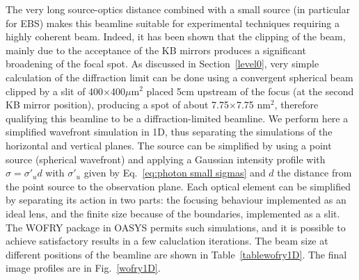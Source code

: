 \documentclass{iucr}              %
\begin{document}
The very long  source-optics distance combined with a small source (in particular for EBS) makes this beamline suitable for experimental techniques requiring a highly coherent beam. Indeed, it has been shown that the clipping of the beam, mainly due to the acceptance of the KB mirrors produces a significant broadening of the focal spot.  As discussed in Section~\ref{level0}, very simple calculation of the diffraction limit can be done using a convergent spherical beam clipped by a slit of 400$\times$400$ \mu$m$^2$ placed 5cm upstream of the focus (at the second KB mirror position), producing a spot of about 7.75$\times$7.75 nm$^2$, therefore qualifying this beamline to be a diffraction-limited beamline. We perform here a simplified wavefront simulation in 1D, thus separating the simulations of the horizontal and vertical planes. The source can be simplified by using a point source (spherical wavefront) and applying a Gaussian intensity profile with $\sigma=\sigma'_u d$ with $\sigma'_u$ given by Eq.~\ref{eq:photon small sigmas} and $d$ the distance from the point source to the observation plane. Each optical element can be simplified by separating its action in two parts: the focusing behaviour implemented as an ideal lens, and the finite size because of the boundaries, implemented as a slit. The WOFRY package in OASYS permits such simulations, and it is possible to achieve satisfactory results in a few caluclation iterations. The beam size at different positions of the beamline are shown in Table~\ref{tablewofry1D}. The final image profiles are in Fig.~\ref{wofry1D}.

\begin{table}[]
    \centering
    \caption{Beam sizes calculated with simplified wave optics propagation (point source and ideal lenses with aperture for modeling the element dimensions). The zoom or scaling factor used for the propagation is also displayed. 
    }
    \label{tablewofry1D}
\end{table}
\end{document}
